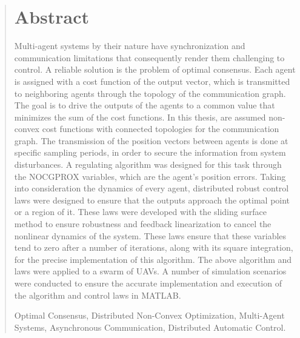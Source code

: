 \begin{abstract}
    \chapter{Abstract}

        Multi-agent systems by their nature have synchronization and communication limitations that consequently render them challenging to control. A reliable solution is the problem of optimal consensus. Each agent is assigned with a cost function of the output vector, which is transmitted to neighboring agents through the topology of the communication graph. The goal is to drive the outputs of the agents to a common value that minimizes the sum of the cost functions. In this thesis, are assumed non-convex cost functions with connected topologies for the communication graph. The transmission of the position vectors between agents is done at specific sampling periods, in order to secure the information from system disturbances. A regulating algorithm was designed for this task through the NOCGPROX variables, which are the agent's position errors. Taking into consideration the dynamics of every agent, distributed robust control laws were designed to ensure that the outputs approach the optimal point or a region of it. These laws were developed with the sliding surface method to ensure robustness and feedback linearization to cancel the nonlinear dynamics of the system. These laws ensure that these variables tend to zero after a number of iterations, along with its square integration, for the precise implementation of this algorithm. The above algorithm and laws were applied to a swarm of UAVs. A number of simulation scenarios were conducted to ensure the accurate implementation and execution of the algorithm and control laws in MATLAB.

        \vspace{20mm}
        \normalsize
        \vspace{5mm}
        \begin{flushleft}
            Optimal Consensus, Distributed Non-Convex Optimization, Multi-Agent Systems, Asynchronous Communication, Distributed Automatic Control.
        \end{flushleft}
\end{abstract}


